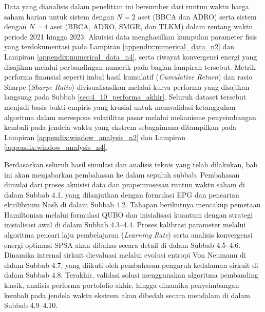 Data yang dianalisis dalam penelitian ini bersumber dari runtun waktu harga saham harian untuk sistem dengan $N=2$ aset (BBCA dan ADRO) serta sistem dengan $N=4$ aset (BBCA, ADRO, SMGR, dan TLKM) dalam rentang waktu periode 2021 hingga 2023. Akuisisi data menghasilkan kumpulan parameter fisis yang terdokumentasi pada Lampiran \ref{appendix:numerical_data_n2} dan Lampiran \ref{appendix:numerical_data_n4}, serta riwayat konvergensi energi yang disajikan melalui perbandingan numerik pada bagian lampiran tersebut. Metrik performa finansial seperti imbal hasil kumulatif (\textit{Cumulative Return}) dan rasio Sharpe (\textit{Sharpe Ratio}) divisualisasikan melalui kurva performa yang disajikan langsung pada Subbab \ref{sec:4_10_performa_akhir}. Seluruh dataset tersebut menjadi basis bukti empiris yang krusial untuk memvalidasi ketangguhan algoritma dalam merespons volatilitas pasar melalui mekanisme penyeimbangan kembali pada jendela waktu yang ekstrem sebagaimana ditampilkan pada Lampiran \ref{appendix:window_analysis_n2} dan Lampiran \ref{appendix:window_analysis_n4}.

Berdasarkan seluruh hasil simulasi dan analisis teknis yang telah dilakukan, bab ini akan menjabarkan pembahasan ke dalam sepuluh subbab. Pembahasan dimulai dari proses akuisisi data dan prapemrosesan runtun waktu saham di dalam Subbab 4.1, yang dilanjutkan dengan formulasi EPG dan pencarian ekuilibrium Nash di dalam Subbab 4.2. Tahapan berikutnya mencakup pemetaan Hamiltonian melalui formulasi QUBO dan inisialisasi kuantum dengan strategi inisialisasi awal di dalam Subbab 4.3--4.4. Proses kalibrasi parameter melalui algoritma pencari laju pembelajaran (\textit{Learning Rate}) serta analisis konvergensi energi optimasi SPSA akan dibahas secara detail di dalam Subbab 4.5--4.6. Dinamika internal sirkuit dievaluasi melalui evolusi entropi Von Neumann di dalam Subbab 4.7, yang diikuti oleh pembahasan pengaruh kedalaman sirkuit di dalam Subbab 4.8. Terakhir, validasi solusi menggunakan algoritma pembanding klasik, analisis performa portofolio akhir, hingga dinamika penyeimbangan kembali pada jendela waktu ekstrem akan dibedah secara mendalam di dalam Subbab 4.9--4.10.





% 


% 

